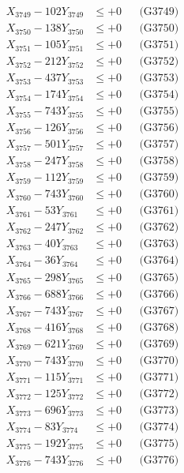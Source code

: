 \documentclass[a4paper,10pt]{article}
\begin{document}
{\begin{align}
X_{3749} - 102Y_{3749} &\leq +0 && \text{(G3749)} \\
X_{3750} - 138Y_{3750} &\leq +0 && \text{(G3750)} \\
\allowbreak
X_{3751} - 105Y_{3751} &\leq +0 && \text{(G3751)} \\
X_{3752} - 212Y_{3752} &\leq +0 && \text{(G3752)} \\
X_{3753} - 437Y_{3753} &\leq +0 && \text{(G3753)} \\
X_{3754} - 174Y_{3754} &\leq +0 && \text{(G3754)} \\
X_{3755} - 743Y_{3755} &\leq +0 && \text{(G3755)} \\
X_{3756} - 126Y_{3756} &\leq +0 && \text{(G3756)} \\
X_{3757} - 501Y_{3757} &\leq +0 && \text{(G3757)} \\
X_{3758} - 247Y_{3758} &\leq +0 && \text{(G3758)} \\
X_{3759} - 112Y_{3759} &\leq +0 && \text{(G3759)} \\
X_{3760} - 743Y_{3760} &\leq +0 && \text{(G3760)} \\
\allowbreak
X_{3761} - 53Y_{3761} &\leq +0 && \text{(G3761)} \\
X_{3762} - 247Y_{3762} &\leq +0 && \text{(G3762)} \\
X_{3763} - 40Y_{3763} &\leq +0 && \text{(G3763)} \\
X_{3764} - 36Y_{3764} &\leq +0 && \text{(G3764)} \\
X_{3765} - 298Y_{3765} &\leq +0 && \text{(G3765)} \\
X_{3766} - 688Y_{3766} &\leq +0 && \text{(G3766)} \\
X_{3767} - 743Y_{3767} &\leq +0 && \text{(G3767)} \\
X_{3768} - 416Y_{3768} &\leq +0 && \text{(G3768)} \\
X_{3769} - 621Y_{3769} &\leq +0 && \text{(G3769)} \\
X_{3770} - 743Y_{3770} &\leq +0 && \text{(G3770)} \\
\allowbreak
X_{3771} - 115Y_{3771} &\leq +0 && \text{(G3771)} \\
X_{3772} - 125Y_{3772} &\leq +0 && \text{(G3772)} \\
X_{3773} - 696Y_{3773} &\leq +0 && \text{(G3773)} \\
X_{3774} - 83Y_{3774} &\leq +0 && \text{(G3774)} \\
X_{3775} - 192Y_{3775} &\leq +0 && \text{(G3775)} \\
X_{3776} - 743Y_{3776} &\leq +0 && \text{(G3776)} \\

\end{align}}
\end{document}
